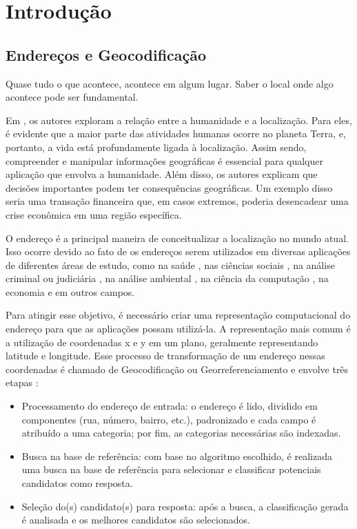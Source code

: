 \chapter{Introdução} \label{Introducao}

\section{Endereços e Geocodificação}
 
\epigraph{Quase tudo o que acontece, acontece em algum lugar. Saber o local onde algo acontece pode ser fundamental.}{\cite{longley2013}}

Em \cite{longley2013}, os autores exploram a relação entre a humanidade e a localização. Para eles, é evidente que a maior parte das atividades humanas ocorre no planeta Terra, e, portanto, a vida está profundamente ligada à localização. Assim sendo, compreender e manipular informações geográficas é essencial para qualquer aplicação que envolva a humanidade. Além disso, os autores explicam que decisões importantes podem ter consequências geográficas. Um exemplo disso seria uma transação financeira que, em casos extremos, poderia desencadear uma crise econômica em uma região específica.

O endereço é a principal maneira de conceitualizar a localização no mundo atual\cite{Zamberg2009}. Isso ocorre devido ao fato de os endereços serem utilizados em diversas aplicações de diferentes áreas de estudo, como na saúde \cite{AmericaJournal2001, Kypri2009, Mazumdar2008}, nas ciências sociais \cite{Chow2011}, na análise criminal ou judiciária \cite{Olligschlaeger1998}, na análise ambiental \cite{Gilboa2006}, na ciência da computação \cite{Zamberg2009}, na economia \cite{Whitsel2006} e em outros campos.

Para atingir esse objetivo, é necessário criar uma representação computacional do endereço para que as aplicações possam utilizá-la. A representação mais comum é a utilização de coordenadas x e y em um plano, geralmente representando latitude e longitude. Esse processo de transformação de um endereço nessas coordenadas é chamado de Geocodificação ou Georreferenciamento e envolve três etapas \cite{Zamberg2009}:

\begin{itemize}
   \item Processamento do endereço de entrada: o endereço é lido, dividido em componentes (rua, número, bairro, etc.), padronizado e cada campo é atribuído a uma categoria; por fim, as categorias necessárias são indexadas.
   \item Busca na base de referência: com base no algoritmo escolhido, é realizada uma busca na base de referência para selecionar e classificar potenciais candidatos como resposta.
   \item Seleção do(s) candidato(s) para resposta: após a busca, a classificação gerada é analisada e os melhores candidatos são selecionados.
\end{itemize}

